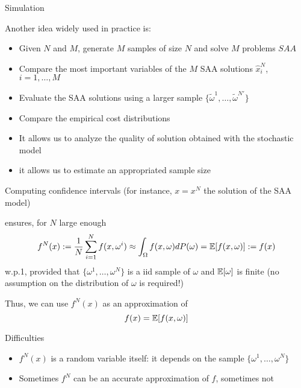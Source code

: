 \begin{frame}{Simulation}

Another idea widely used in practice is:
\begin {itemize}
\item Given $ N $ and $ M $, generate $ M $  samples of size $ N $ and solve $ M $ problems $ SAA $
\pula

\item Compare the most important variables of the $ M $  SAA solutions $ \hat x^N_i$, $ i = 1, \ldots, M$
\pula

\item Evaluate the SAA solutions using a larger sample $\{ \tilde \omega^1, \ldots, \tilde \omega^{N'} \}$
\pula

\item Compare the empirical cost distributions
\end{itemize}
\pula


\pula
{}
\begin{itemize}
\item It allows  us to analyze the quality of solution obtained with the stochastic model
\pula

\item it allows us to estimate an appropriated sample size
\end{itemize}
\end{frame}


\begin{frame}{Computing confidence intervals}
(for instance, $x=x^N$ the solution of the SAA model)

\pula

 ensures, for $N$ large enough
\[
f^N(x):=\frac{1}{N}\sum_{i=1}^N f(x,\omega^i) \approx \int_{\Omega}f(x,\omega)dP(\omega)=\mathbb{E}[f(x,\omega)]:=f(x)
\]
w.p.1, provided that $\{\omega^1,\ldots, \omega^N\}$ is a iid sample of $\omega$ and $\mathbb{E}[\omega]$ is finite (no assumption on the distribution of $\omega$ is required!)
\pula

Thus, we can use $f^N(x)$ as an approximation of \[f(x)=\mathbb{E}[f(x,\omega)]\]

\begin{block}{Difficulties}
\begin{itemize}
\item $f^N(x)$ is a random variable itself: it depends on the sample $\{\omega^1,\ldots, \omega^N\}$
\pula

\item Sometimes $f^N$ can be an accurate approximation of $f$, sometimes not
\end{itemize}
\end{block}
 \end{frame}

